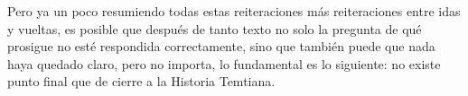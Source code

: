 \documentclass[
  spanish,
]{book}
\begin{document}
Pero ya un poco resumiendo todas estas reiteraciones más reiteraciones entre idas y vueltas, es posible que después de tanto texto no solo la pregunta de qué prosigue no esté respondida correctamente, sino que también puede que nada haya quedado claro, pero no importa, lo fundamental es lo siguiente: no existe punto final que de cierre a la Historia Temtiana.
\end{document}
